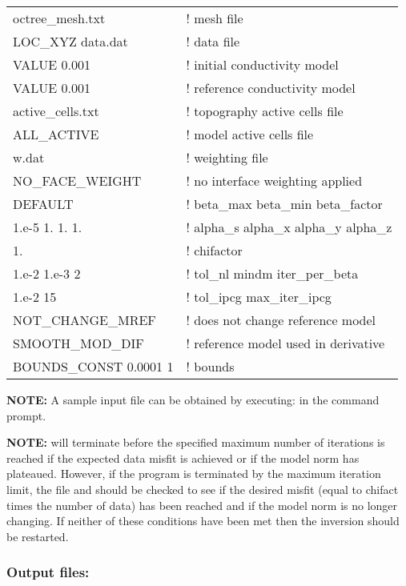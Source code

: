 \begin{fileExample}
\begin{tabular}{|ll|}
\hline
octree\_mesh.txt & ! mesh file \\
LOC\_XYZ data.dat & ! data file \\
VALUE 0.001 & ! initial conductivity model \\
VALUE 0.001 & ! reference conductivity model \\
active\_cells.txt & ! topography active cells file \\
ALL\_ACTIVE & ! model active cells file \\
w.dat & ! weighting file\\
NO\_FACE\_WEIGHT  & ! no interface weighting applied \\
DEFAULT & ! beta\_max  beta\_min  beta\_factor \\
1.e-5  1.  1.  1. & ! alpha\_s  alpha\_x  alpha\_y  alpha\_z \\
1. & ! chifactor\\
1.e-2  1.e-3  2 & ! tol\_nl  mindm  iter\_per\_beta \\
1.e-2  15 & ! tol\_ipcg  max\_iter\_ipcg \\
NOT\_CHANGE\_MREF & ! does not change reference model \\
SMOOTH\_MOD\_DIF & ! reference model used in derivative \\
BOUNDS\_CONST  0.0001  1 & ! bounds \\
\hline
\end{tabular}
\end{fileExample} 

\textbf{NOTE:} A sample input file can be obtained by executing:  in the command prompt.

\textbf{NOTE:}  will terminate before the specified maximum number of iterations is reached if the expected data misfit is achieved or if the model norm has plateaued. However, if the program is terminated by the maximum iteration limit, the file  and  should be checked to see if the desired misfit (equal to chifact times the number of data) has been reached and if the model norm is no longer changing. If neither of these conditions have been met then the inversion should be restarted.


\subsubsection{Output files:}

